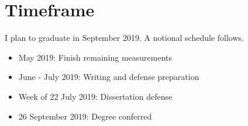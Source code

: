 \documentclass[11pt]{article}
\begin{document}
\section{Timeframe}
I plan to graduate in September 2019. A notional schedule follows.

\begin{itemize}
	\item May 2019: Finish remaining measurements
	\item June - July 2019: Writing and defense preparation
	\item Week of 22 July 2019: Dissertation defense
	\item 26 September 2019: Degree conferred	
\end{itemize}



\end{document}
